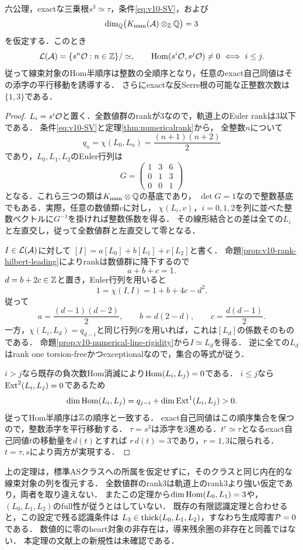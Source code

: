 \documentclass[11pt,a4paper]{ltjsarticle}
\begin{document}
\begin{theorem}[数値rank三における内在的な線束列の復元]
\label{thm:v10-numerical-line-lattice}
六公理，exactな三乗根$s^3\simeq\tau$，条件\eqref{eq:v10-SV}，および
\[
 \dim_{\mathbb Q}\bigl(K_{\mathrm{num}}(\mathcal A)\otimes_{\mathbb Z}\mathbb Q\bigr)=3
\]
を仮定する．このとき
\[
 \mathcal L(\mathcal A)=\{s^n\mathcal O:n\in\mathbb Z\}/\simeq,
 \qquad
 \operatorname{Hom}(s^i\mathcal O,s^j\mathcal O)\ne0\ \Longleftrightarrow\ i\leq j.
\]
従って線束対象のHom半順序は整数の全順序となり，任意のexact自己同値はその添字の平行移動を誘導する．
さらにexactな反Serre根の可能な正整数次数は$\{1,3\}$である．
\end{theorem}
\begin{proof}
$L_i=s^i\mathcal O$と置く．全数値群のrankが3なので，軌道上のEuler rankは3以下である．
条件\eqref{eq:v10-SV}と定理\ref{thm:numericalrank}から，
全整数$n$について
\[
 q_n=\chi(L_0,L_n)=\frac{(n+1)(n+2)}2
\]
であり，$L_0,L_1,L_2$のEuler行列は
\[
 G=\begin{pmatrix}1&3&6\\0&1&3\\0&0&1\end{pmatrix}
\]
となる．これら三つの類は$K_{\mathrm{num}}\otimes\mathbb Q$の基底であり，
$\det G=1$なので整数基底でもある．実際，任意の数値類$v$に対し，
$\chi(L_i,v)$，$i=0,1,2$を列に並べた整数ベクトルに$G^{-1}$を掛ければ整数係数を得る．
その線形結合との差は全ての$L_i$と左直交し，従って全数値群と左直交して零となる．

$I\in\mathcal L(\mathcal A)$に対して
$[I]=a[L_0]+b[L_1]+c[L_2]$と書く．
命題\ref{prop:v10-rank-hilbert-leading}によりrankは数値群に降下するので
\[
 a+b+c=1.
\]
$d=b+2c\in\mathbb Z$と置き，Euler行列を用いると
\[
 1=\chi(I,I)=1+b+4c-d^2.
\]
従って
\[
 a=\frac{(d-1)(d-2)}2,\qquad
 b=d(2-d),\qquad c=\frac{d(d-1)}2.
\]
一方，$\chi(L_i,L_d)=q_{d-i}$と同じ行列$G$を用いれば，これは$[L_d]$の係数そのものである．
命題\ref{prop:v10-numerical-line-rigidity}から$I\simeq L_d$を得る．
逆に全ての$L_d$はrank one torsion-freeかつexceptionalなので，集合の等式が従う．

$i>j$なら既存の負次数Hom消滅により$\operatorname{Hom}(L_i,L_j)=0$である．
$i\leq j$なら$\operatorname{Ext}^2(L_i,L_j)=0$であるため
\[
 \dim\operatorname{Hom}(L_i,L_j)
 =q_{j-i}+\dim\operatorname{Ext}^1(L_i,L_j)>0.
\]
従ってHom半順序は$\mathbb Z$の順序と一致する．
exact自己同値はこの順序集合を保つので，整数添字を平行移動する．
$\tau=s^3$は添字を3進める．$t^r\simeq\tau$となるexact自己同値$t$の移動量を$d(t)$とすれば
$r\,d(t)=3$であり，$r=1,3$に限られる．$t=\tau,s$により両方が実現する．
\end{proof}

\begin{remark}[この復元と圏の認識との間に残る生成条件]
上の定理は，標準ASクラスへの所属を仮定せずに，そのクラスと同じ内在的な線束対象の列を復元する．
全数値群のrank3は軌道上のrank3より強い仮定であり，両者を取り違えない．
またこの定理から$\dim\operatorname{Hom}(L_0,L_1)=3$や，$(L_0,L_1,L_2)$のfull性が従うとはしていない．
既存の有限認識定理と合わせると，この設定で残る認識条件は
$L_3\in\operatorname{thick}(L_0,L_1,L_2)$，すなわち生成障害$\mathcal P=0$である．
数値的に零のheart対象の非存在は，導来残余圏の非存在と同義ではない．
本定理の文献上の新規性は未確認である．
\end{remark}
\end{document}
